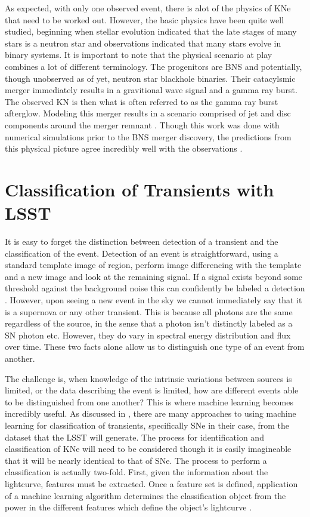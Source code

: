 \documentclass[12pt]{article}
\begin{document}
As expected, with only one observed event, there is alot of the physics of KNe that need to be worked out. However, the basic physics have been quite well studied, beginning when stellar evolution indicated that the late stages of many stars is a neutron star and observations indicated that many stars evolve in binary systems. It is important to note that the physical scenario at play combines a lot of different terminology. The progenitors are BNS and potentially, though unobserved as of yet, neutron star blackhole binaries. Their catacylsmic merger immediately results in a gravitional wave signal and a gamma ray burst. The observed KN is then what is often referred to as the gamma ray burst afterglow. Modeling this merger results in a scenario comprised of jet and disc components around the merger remnant \citep{Rosswog2016a}. Though this work was done with numerical simulations prior to the BNS merger discovery, the predictions from this physical picture agree incredibly well with the observations \citep{Kasliwal2017}.\par

\section{Classification of Transients with LSST} %
It is easy to forget the distinction between detection of a transient and the classification of the event. Detection of an event is straightforward, using a standard template image of region, perform image differencing with the template and a new image and look at the remaining signal. If a signal exists beyond some threshold against the background noise this can confidently be labeled a detection \citep{LSSTScienceCollaboration2009}. However, upon seeing a new event in the sky we cannot immediately say that it is a supernova or any other transient. This is because all photons are the same regardless of the source, in the sense that a photon isn't distinctly labeled as a SN photon etc. However, they do vary in spectral energy distribution and flux over time. These two facts alone allow us to distinguish one type of an event from another. \par
The challenge is, when knowledge of the intrinsic variations between sources is limited, or the data describing the event is limited, how are different events able to be distinguished from one another? This is where machine learning becomes incredibly useful. As discussed in \cite{Lochner2016}, there are many approaches to using machine learning for classification of transients, specifically SNe in their case, from the dataset that the LSST will generate. The process for identification and classification of KNe will need to be considered though it is easily imagineable that it will be nearly identical to that of SNe. The process to perform a classification is actually two-fold. First, given the information about the lightcurve, features must be extracted. Once a feature set is defined, application of a machine learning algorithm determines the classification object from the power in the different features which define the object's lightcurve \citep{Lochner2016}. \par
\end{document}
